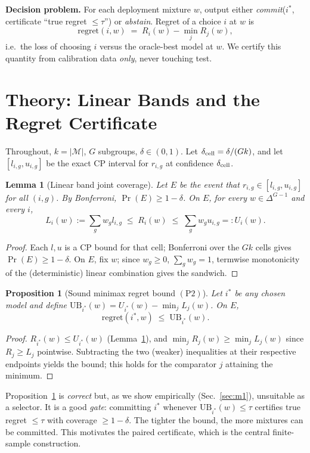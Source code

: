 \documentclass{article}
\newtheorem{lemma}{Lemma}
\newtheorem{proposition}{Proposition}
\begin{document}
\textbf{Decision problem.} For each deployment mixture $w$, output either
\emph{commit}($i^*$, certificate ``true regret $\le\tau$'') or \emph{abstain}. Regret of a
choice $i$ at $w$ is
\[
  \mathrm{regret}(i,w) \;=\; R_i(w)-\min_{j} R_j(w),
\]
i.e.\ the loss of choosing $i$ versus the oracle-best model at $w$. We certify this quantity
from calibration data \emph{only}, never touching test.

\section{Theory: Linear Bands and the Regret Certificate}
\label{sec:theory}

Throughout, $k=|\mathcal{M}|$, $G$ subgroups, $\delta\in(0,1)$. Let
$\delta_{\rm cell}=\delta/(G k)$, and let $[l_{i,g},u_{i,g}]$ be the exact CP interval for
$r_{i,g}$ at confidence $\delta_{\rm cell}$.

\begin{lemma}[Linear band joint coverage]
\label{lem:band}
Let $E$ be the event that $r_{i,g}\in[l_{i,g},u_{i,g}]$ for all $(i,g)$. By
Bonferroni, $\Pr(E)\ge 1-\delta$. On $E$, for every $w\in\Delta^{G-1}$ and every $i$,
\[
  L_i(w):=\sum_g w_g l_{i,g}\;\le\; R_i(w)\;\le\;
  \sum_g w_g u_{i,g}=:U_i(w).
\]
\end{lemma}
\begin{proof}
Each $l,u$ is a CP bound for that cell; Bonferroni over the $G k$ cells gives
$\Pr(E)\ge1-\delta$. On $E$, fix $w$; since $w_g\ge0$, $\sum_g w_g=1$, termwise monotonicity
of the (deterministic) linear combination gives the sandwich.
\end{proof}

\begin{proposition}[Sound minimax regret bound $(\mathrm{P2})$]
\label{prop:p2}
Let $i^*$ be any chosen model and define
$\mathrm{UB}_{i^*}(w)=U_{i^*}(w)-\min_j L_j(w)$. On $E$,
\[
  \mathrm{regret}(i^*,w)\;\le\;\mathrm{UB}_{i^*}(w).
\]
\end{proposition}
\begin{proof}
$R_{i^*}(w)\le U_{i^*}(w)$ (Lemma~\ref{lem:band}), and
$\min_j R_j(w)\ge \min_j L_j(w)$ since $R_j\ge L_j$ pointwise. Subtracting the two
(weaker) inequalities at their respective endpoints yields the bound; this holds for the
comparator $j$ attaining the minimum.
\end{proof}

Proposition~\ref{prop:p2} is \emph{correct} but, as we show empirically
(Sec.~\ref{sec:m1}), unsuitable as a selector. It is a good \emph{gate}: committing $i^*$
whenever $\mathrm{UB}_{i^*}(w)\le\tau$ certifies true regret $\le\tau$ with coverage
$\ge1-\delta$. The tighter the bound, the more mixtures can be committed. This motivates the
paired certificate, which is the central finite-sample construction.
\end{document}
